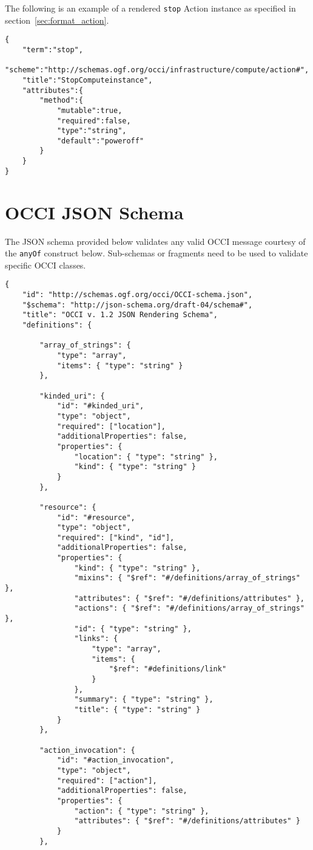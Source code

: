 \documentclass[10pt,a4paper]{article}
\begin{document}
\begin{appendices}
The following is an example of a rendered \texttt{stop} Action instance as specified in section~\ref{sec:format_action}.

\begin{lstlisting}
{
    "term":"stop",
    "scheme":"http://schemas.ogf.org/occi/infrastructure/compute/action#",
    "title":"StopComputeinstance",
    "attributes":{
        "method":{
            "mutable":true,
            "required":false,
            "type":"string",
            "default":"poweroff"
        }
    }
}
\end{lstlisting}


\section{OCCI JSON Schema}

The JSON schema provided below validates any valid OCCI message courtesy of the \texttt{anyOf} construct below. Sub-schemas or fragments need to be used to validate specific OCCI classes.

\lstset{
   language=json,
   basicstyle=\tiny,
   xleftmargin=0.0cm
}
\begin{lstlisting}
{
	"id": "http://schemas.ogf.org/occi/OCCI-schema.json",
	"$schema": "http://json-schema.org/draft-04/schema#",
	"title": "OCCI v. 1.2 JSON Rendering Schema",
	"definitions": {

		"array_of_strings": {
			"type": "array",
			"items": { "type": "string" }
		},

		"kinded_uri": {
			"id": "#kinded_uri",
			"type": "object",
			"required": ["location"],
			"additionalProperties": false,
			"properties": {
				"location": { "type": "string" },
				"kind": { "type": "string" }
			}
		},

		"resource": {
			"id": "#resource",
			"type": "object",
			"required": ["kind", "id"],
			"additionalProperties": false,
			"properties": {
				"kind": { "type": "string" },
				"mixins": { "$ref": "#/definitions/array_of_strings" },
				"attributes": { "$ref": "#/definitions/attributes" },
				"actions": { "$ref": "#/definitions/array_of_strings" },
				"id": { "type": "string" },
				"links": {
					"type": "array",
					"items": {
						"$ref": "#definitions/link"
					}
				},
				"summary": { "type": "string" },
				"title": { "type": "string" }
			}
		},

		"action_invocation": {
			"id": "#action_invocation",
			"type": "object",
			"required": ["action"],
			"additionalProperties": false,
			"properties": {
				"action": { "type": "string" },
				"attributes": { "$ref": "#/definitions/attributes" }
			}
		},


\end{lstlisting}
\end{appendices}
\end{document}
